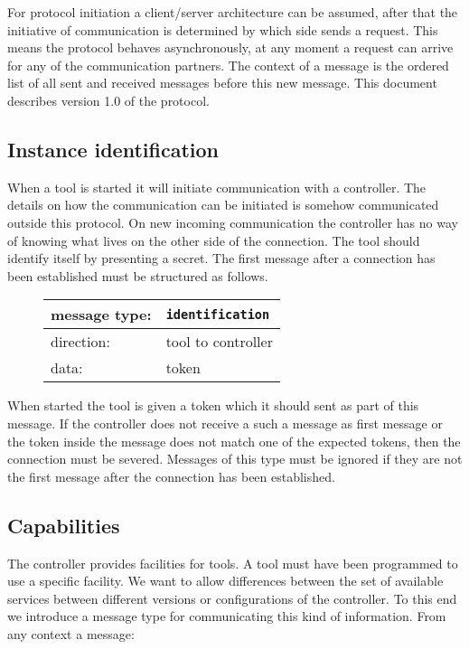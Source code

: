 \documentclass{article}
\newcommand{\msg}[1]{\texttt{#1}}
\begin{document}
  For protocol initiation a client/server architecture can be assumed, after
  that the initiative of communication is determined by which side sends a
  request. This means the protocol behaves asynchronously, at any moment a
  request can arrive for any of the communication partners. The context of a
  message is the ordered list of all sent and received messages before this new
  message.  This document describes version 1.0 of the protocol.

  \subsection{Instance identification}

   When a tool is started it will initiate communication with a controller.
   The details on how the communication can be initiated is somehow
   communicated outside this protocol. On new incoming communication the
   controller has no way of knowing what lives on the other side of the
   connection. The tool should identify itself by presenting a secret. The
   first message after a connection has been established must be structured as
   follows.
   
   \begin{figure}[H]
    \begin{tabular}{|ll|}
     \hline
     message type:    & \msg{identification} \\
     \hline
     direction:       & tool to controller \\
     data:            & token \\
     \hline
    \end{tabular}
   \end{figure}

   \noindent When started the tool is given a token which it should sent as
   part of this message. If the controller does not receive a such a message as
   first message or the token inside the message does not match one of the
   expected tokens, then the connection must be severed. Messages of this type
   must be ignored if they are not the first message after the connection has
   been established.

  \subsection{Capabilities}

   The controller provides facilities for tools. A tool must have been
   programmed to use a specific facility. We want to allow differences between
   the set of available services between different versions or configurations
   of the controller. To this end we introduce a message type for communicating
   this kind of information. From any context a message:
\end{document}
